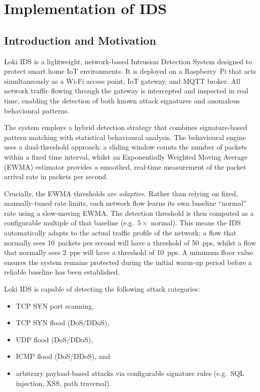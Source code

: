 \documentclass[12pt,a4paper]{article}
\begin{document}
\newpage
\section{Implementation of IDS}
\label{sec:ids}

\subsection{Introduction and Motivation}
\label{sec:ids_intro}

Loki IDS is a lightweight, network-based Intrusion Detection System designed to protect smart home IoT environments. It is deployed on a Raspberry~Pi that acts simultaneously as a Wi-Fi access point, IoT gateway, and MQTT broker. All network traffic flowing through the gateway is intercepted and inspected in real time, enabling the detection of both known attack signatures and anomalous behavioural patterns.

The system employs a hybrid detection strategy that combines signature-based pattern matching with statistical behavioural analysis. The behavioural engine uses a dual-threshold approach: a sliding window counts the number of packets within a fixed time interval, whilst an Exponentially Weighted Moving Average (EWMA) estimator provides a smoothed, real-time measurement of the packet arrival rate in packets per second.

Crucially, the EWMA thresholds are \emph{adaptive}. Rather than relying on fixed, manually-tuned rate limits, each network flow learns its own baseline ``normal'' rate using a slow-moving EWMA. The detection threshold is then computed as a configurable multiple of that baseline (e.g.\ $5\times$ normal). This means the IDS automatically adapts to the actual traffic profile of the network: a flow that normally sees 10~packets per second will have a threshold of 50~pps, whilst a flow that normally sees 2~pps will have a threshold of 10~pps. A minimum floor value ensures the system remains protected during the initial warm-up period before a reliable baseline has been established.

Loki IDS is capable of detecting the following attack categories:
\begin{itemize}
    \item TCP SYN port scanning,
    \item TCP SYN flood (DoS/DDoS),
    \item UDP flood (DoS/DDoS),
    \item ICMP flood (DoS/DDoS), and
    \item arbitrary payload-based attacks via configurable signature rules (e.g.\ SQL injection, XSS, path traversal).
\end{itemize}
\end{document}
